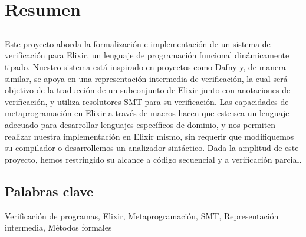 \chapter*{Resumen}

\section*{\tituloPortadaVal}

Este proyecto aborda la formalización e implementación de un sistema de
verificación para Elixir, un lenguaje de programación funcional dinámicamente
tipado.  Nuestro sistema está inspirado en proyectos como Dafny y, de manera
similar, se apoya en una representación intermedia de verificación, la cual será
objetivo de la traducción de un subconjunto de Elixir junto con anotaciones de
verificación, y utiliza resolutores SMT para su verificación. Las capacidades de
metaprogramación en Elixir a través de macros hacen que este sea un lenguaje
adecuado para desarrollar lenguajes específicos de dominio, y nos permiten
realizar nuestra implementación en Elixir mismo, sin requerir que modifiquemos
su compilador o desarrollemos un analizador sintáctico. Dada la amplitud de este
proyecto, hemos restringido su alcance a código secuencial y a verificación
parcial.

\section*{Palabras clave}
   
\noindent Verificación de programas, Elixir, Metaprogramación, SMT, Representación intermedia, Métodos formales
